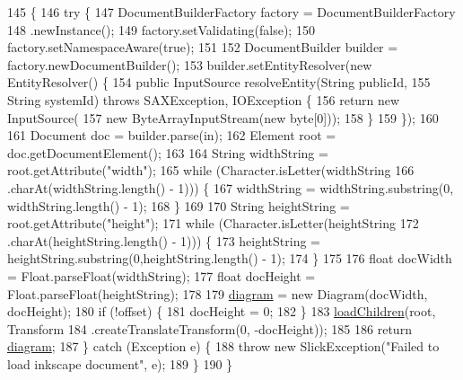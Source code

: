 \begin{DoxyCode}
145                                   \{
146         \textcolor{keywordflow}{try} \{
147             DocumentBuilderFactory factory = DocumentBuilderFactory
148                     .newInstance();
149             factory.setValidating(\textcolor{keyword}{false});
150             factory.setNamespaceAware(\textcolor{keyword}{true});
151 
152             DocumentBuilder builder = factory.newDocumentBuilder();
153             builder.setEntityResolver(\textcolor{keyword}{new} EntityResolver() \{
154                 \textcolor{keyword}{public} InputSource resolveEntity(String publicId,
155                         String systemId) \textcolor{keywordflow}{throws} SAXException, IOException \{
156                     \textcolor{keywordflow}{return} \textcolor{keyword}{new} InputSource(
157                             \textcolor{keyword}{new} ByteArrayInputStream(\textcolor{keyword}{new} byte[0]));
158                 \}
159             \});
160 
161             Document doc = builder.parse(in);
162             Element root = doc.getDocumentElement();
163 
164             String widthString = root.getAttribute(\textcolor{stringliteral}{"width"});
165             \textcolor{keywordflow}{while} (Character.isLetter(widthString
166                     .charAt(widthString.length() - 1))) \{
167                 widthString = widthString.substring(0, widthString.length() - 1);
168             \}
169 
170             String heightString = root.getAttribute(\textcolor{stringliteral}{"height"});
171             \textcolor{keywordflow}{while} (Character.isLetter(heightString
172                     .charAt(heightString.length() - 1))) \{
173                 heightString = heightString.substring(0,heightString.length() - 1);
174             \}
175 
176             \textcolor{keywordtype}{float} docWidth = Float.parseFloat(widthString);
177             \textcolor{keywordtype}{float} docHeight = Float.parseFloat(heightString);
178 
179             \mbox{\hyperlink{classorg_1_1newdawn_1_1slick_1_1svg_1_1_inkscape_loader_a42085121425f35e4e3be17052cf39dbc}{diagram}} = \textcolor{keyword}{new} Diagram(docWidth, docHeight);
180             \textcolor{keywordflow}{if} (!offset) \{
181                 docHeight = 0;
182             \}
183             \mbox{\hyperlink{classorg_1_1newdawn_1_1slick_1_1svg_1_1_inkscape_loader_ac08d33005336e9ca1dedd9c092c35bcb}{loadChildren}}(root, Transform
184                     .createTranslateTransform(0, -docHeight));
185 
186             \textcolor{keywordflow}{return} \mbox{\hyperlink{classorg_1_1newdawn_1_1slick_1_1svg_1_1_inkscape_loader_a42085121425f35e4e3be17052cf39dbc}{diagram}};
187         \} \textcolor{keywordflow}{catch} (Exception e) \{
188             \textcolor{keywordflow}{throw} \textcolor{keyword}{new} SlickException(\textcolor{stringliteral}{"Failed to load inkscape document"}, e);
189         \}
190     \}
\end{DoxyCode}
